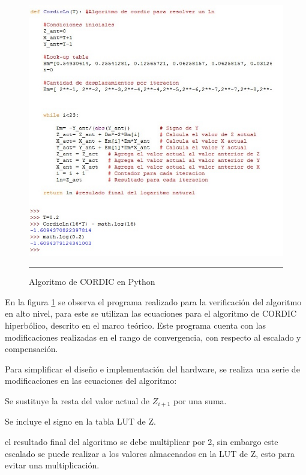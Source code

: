\begin{figure}[H]
  \centering
    \includegraphics[scale=0.6]{./Progra_Cordic.jpg}
    \rule{35em}{0.5pt}
  \caption[Algoritmo de CORDIC en Python]{Algoritmo de CORDIC en Python  }
  \label{fig:Python}
\end{figure}


En la figura \ref{fig:Python} se observa el programa realizado para la verificación del algoritmo en alto nivel, para este se utilizan las ecuaciones para el algoritmo de CORDIC hiperbólico, descrito en el marco teórico. Este programa cuenta con las modificaciones realizadas en el rango de convergencia, con respecto al escalado y compensación. 

Para simplificar el diseño e implementación del hardware, se realiza una serie de modificaciones en las ecuaciones del algoritmo: 

\begin{compactitem}

\item Se sustituye la resta del valor actual de $ Z_{i+1} $ por una suma. 
\item Se incluye el signo en la tabla LUT de Z.
\item el resultado final del algoritmo se debe multiplicar por 2, sin embargo este escalado se puede realizar a los valores almacenados en la LUT de Z, esto para evitar una multiplicación. 
\end{compactitem}



